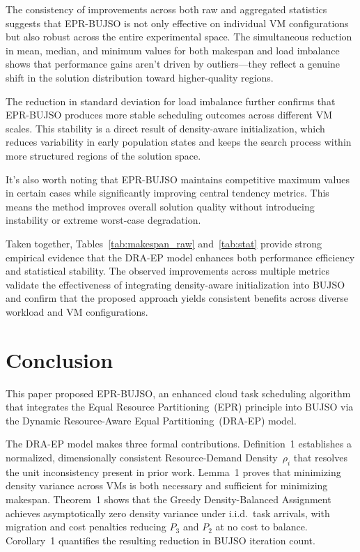\documentclass[journal]{IEEEtran}
\begin{document}
The consistency of improvements across both raw and aggregated statistics suggests that EPR-BUJSO is not only effective on individual VM configurations but also robust across the entire experimental space. The simultaneous reduction in mean, median, and minimum values for both makespan and load imbalance shows that performance gains aren't driven by outliers---they reflect a genuine shift in the solution distribution toward higher-quality regions.

The reduction in standard deviation for load imbalance further confirms that EPR-BUJSO produces more stable scheduling outcomes across different VM scales. This stability is a direct result of density-aware initialization, which reduces variability in early population states and keeps the search process within more structured regions of the solution space.

It's also worth noting that EPR-BUJSO maintains competitive maximum values in certain cases while significantly improving central tendency metrics. This means the method improves overall solution quality without introducing instability or extreme worst-case degradation.

Taken together, Tables~\ref{tab:makespan_raw} and~\ref{tab:stat} provide strong empirical evidence that the DRA-EP model enhances both performance efficiency and statistical stability. The observed improvements across multiple metrics validate the effectiveness of integrating density-aware initialization into BUJSO and confirm that the proposed approach yields consistent benefits across diverse workload and VM configurations.

\section{Conclusion}
\label{sec:conclusion}

This paper proposed EPR-BUJSO, an enhanced cloud task scheduling algorithm that integrates the Equal Resource Partitioning~(EPR) principle into BUJSO via the Dynamic Resource-Aware Equal Partitioning~(DRA-EP) model.

The DRA-EP model makes three formal contributions. Definition~1 establishes a normalized, dimensionally consistent Resource-Demand Density~$\rho_i$ that resolves the unit inconsistency present in prior work. Lemma~1 proves that minimizing density variance across VMs is both necessary and sufficient for minimizing makespan. Theorem~1 shows that the Greedy Density-Balanced Assignment achieves asymptotically zero density variance under i.i.d.\ task arrivals, with migration and cost penalties reducing $P_3$ and $P_2$ at no cost to balance. Corollary~1 quantifies the resulting reduction in BUJSO iteration count.
\end{document}
